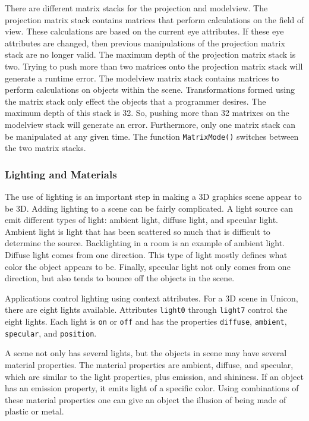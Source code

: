 There are different matrix stacks for the projection and modelview. The
projection matrix stack contains matrices that perform calculations on
the field of view. These calculations are based on the current eye
attributes. If these eye attributes are changed, then previous
manipulations of the projection matrix stack are no longer valid. The
maximum depth of the projection matrix stack is two. Trying to push
more than two matrices onto the projection matrix stack will generate a
runtime error. The modelview matrix stack contains matrices to perform
calculations on objects within the scene. Transformations formed using
the matrix stack only effect the objects that a programmer desires. The
maximum depth of this stack is 32. So, pushing more than 32 matrixes on
the modelview stack will generate an error. Furthermore, only one
matrix stack can be manipulated at any given time. The function
\texttt{MatrixMode()} switches between the two matrix stacks. 

\subsubsection{Lighting and Materials}

The use of lighting is an important step in making a 3D graphics scene
appear to be 3D. Adding lighting to a scene can be fairly complicated.
A light source can emit different types of light: ambient light,
diffuse light, and specular light. Ambient light is light that has
been scattered so much that is difficult to determine the source.
Backlighting in a room is an example of ambient light. Diffuse light
comes from one direction. This type of light mostly defines what color
the object appears to be. Finally, specular light not only comes from
one direction, but also tends to bounce off the objects in the scene.

Applications control lighting using context attributes. For a 3D scene
in Unicon, there are eight lights available. Attributes \texttt{light0}
through \texttt{light7} control the eight lights. Each light is
\texttt{on} or \texttt{off} and has the properties \texttt{diffuse},
\texttt{ambient}, \texttt{specular}, and \texttt{position}. 

A scene not only has several lights, but the objects in scene may have
several material properties. The material properties are ambient,
diffuse, and specular, which are similar to the light properties, plus
emission, and shininess. If an object has an emission property, it
emits light of a specific color. Using combinations of these material
properties one can give an object the illusion of being made of plastic
or metal.


